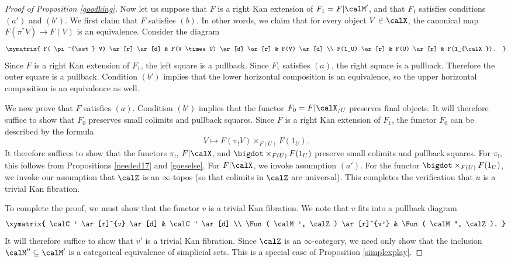 \begin{proof}[Proof of Proposition \ref{goodking}]
Now let us suppose that $F$ is a right Kan extension of $F_1 = F | \calM'$, and that
$F_1$ satisfies conditions $(a')$ and $(b')$. We first claim that $F$ satisfies $(b)$.
In other words, we claim that for every object $V \in \calX$, the canonical map
$F( \pi^{\ast} V) \rightarrow F(V)$ is an equivalence. Consider the diagram
$$ \xymatrix{ F( \pi^{\ast} V) \ar[r] \ar[d] & F(V \times U) \ar[d] \ar[r] & F(V) \ar[d] \\
F(1_U) \ar[r] & F(U) \ar[r] & F(1_{\calX}). }$$
Since $F$ is a right Kan extension of $F_1$, the left square is a pullback.
Since $F_1$ satisfies $(a)$, the right square is a pullback. Therefore the outer square is a pullback. Condition $(b')$ implies that the lower horizontal composition is an equivalence, so the upper horizontal composition is an equivalence as well.

We now prove that $F$ satisfies $(a)$. Condition $(b')$ implies that the functor
$F_0 = F | \calX_{/U}$ preserves final objects. It will therefore suffice to show that
$F_0$ preserves small colimits and pullback squares.
Since $F$ is a right Kan extension of $F_1$, the
functor $F_0$ can be described by the formula
$$ V \mapsto F( \pi_{!} V) \times_{ F(U) } F(1_U).$$
It therefore suffices to show that the functors $\pi_{!}$, $F|\calX$, and
$\bigdot \times_{ F(U)} F(1_U)$ preserve small colimits and pullback squares.
For $\pi_{!}$, this follows from Propositions \ref{needed17} and \ref{goeselse}.
For $F|\calX$, we invoke assumption $(a')$. For the functor $\bigdot \times_{ F(U)} F(1_{U})$, we
invoke our assumption that $\calZ$ is an $\infty$-topos (so that colimits in $\calZ$ are universal).
This completes the verification that $u$ is a trivial Kan fibration.

To complete the proof, we must show that the functor $v$ is a trivial Kan fibration.
We note that $v$ fits into a pullback diagram
$$ \xymatrix{ \calC' \ar[r]^{v} \ar[d] & \calC'' \ar[d] \\
\Fun( \calM', \calZ) \ar[r]^{v'} & \Fun( \calM'', \calZ ). }$$
It will therefore suffice to show that $v'$ is a trivial Kan fibration. Since
$\calZ$ is an $\infty$-category, we need only show that the inclusion
$\calM'' \subseteq \calM'$ is a categorical equivalence of simplicial sets. This is a special case of
Proposition \ref{simplexplay}.
\end{proof}


